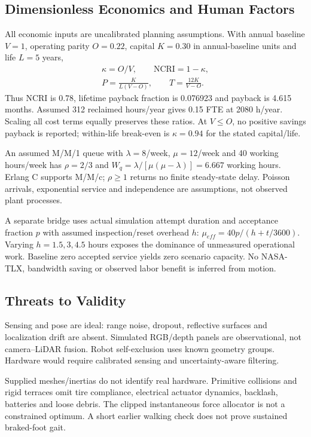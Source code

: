 \documentclass[conference]{IEEEtran}
\begin{document}
\subsection{Dimensionless Economics and Human Factors}
All economic inputs are uncalibrated planning assumptions. With annual baseline $V=1$, operating parity $O=0.22$, capital $K=0.30$ in annual-baseline units and life $L=5$ years,
\begin{equation}
\begin{gathered}
\kappa=O/V,\qquad\mathrm{NCRI}=1-\kappa,\\
P=\frac{K}{L(V-O)},\qquad T=\frac{12K}{V-O}.
\end{gathered}
\end{equation}
Thus NCRI is 0.78, lifetime payback fraction is 0.076923 and payback is 4.615 months. Assumed 312 reclaimed hours/year gives 0.15 FTE at 2080 h/year. Scaling all cost terms equally preserves these ratios. At $V\le O$, no positive savings payback is reported; within-life break-even is $\kappa=0.94$ for the stated capital/life.

An assumed M/M/1 queue with $\lambda=8$/week, $\mu=12$/week and 40 working hours/week has $\rho=2/3$ and $W_q=\lambda/[\mu(\mu-\lambda)]=6.667$ working hours. Erlang C supports M/M/c; $\rho\ge1$ returns no finite steady-state delay. Poisson arrivals, exponential service and independence are assumptions, not observed plant processes.

A separate bridge uses actual simulation attempt duration and acceptance fraction $p$ with assumed inspection/reset overhead $h$: $\mu_{eff}=40p/(h+t/3600)$. Varying $h=1.5,3,4.5$ hours exposes the dominance of unmeasured operational work. Baseline zero accepted service yields zero scenario capacity. No NASA-TLX, bandwidth saving or observed labor benefit is inferred from motion.

\subsection{Threats to Validity}
Sensing and pose are ideal: range noise, dropout, reflective surfaces and localization drift are absent. Simulated RGB/depth panels are observational, not camera--LiDAR fusion. Robot self-exclusion uses known geometry groups. Hardware would require calibrated sensing and uncertainty-aware filtering.

Supplied meshes/inertias do not identify real hardware. Primitive collisions and rigid terraces omit tire compliance, electrical actuator dynamics, backlash, batteries and loose debris. The clipped instantaneous force allocator is not a constrained optimum. A short earlier walking check does not prove sustained braked-foot gait.
\end{document}
